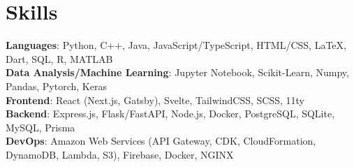 \documentclass{article}
\begin{document}
\section*{Skills}
\textbf{Languages}: Python, C++, Java, JavaScript/TypeScript, HTML/CSS, {\selectfont\LaTeX}, Dart, SQL, R, MATLAB\\
\textbf{Data Analysis/Machine Learning}: Jupyter Notebook, Scikit-Learn, Numpy, Pandas, Pytorch, Keras\\
\textbf{Frontend}: React (Next.js, Gatsby), Svelte, TailwindCSS, SCSS, 11ty\\
\textbf{Backend}: Express.js, Flask/FastAPI, Node.js, Docker, PostgreSQL, SQLite, MySQL, Prisma\\
\textbf{DevOps}: Amazon Web Services (API Gateway, CDK, CloudFormation, DynamoDB, Lambda, S3), Firebase, Docker, NGINX
\end{document}

